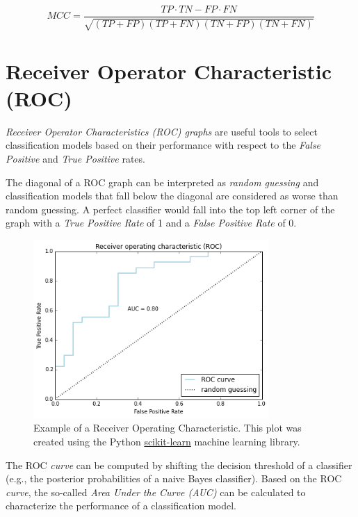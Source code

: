 \documentclass{article}
\begin{document}
\begin{equation} MCC = \frac{ TP \cdot TN - FP \cdot FN } {\sqrt{ (TP + FP) ( TP + FN ) ( TN + FP ) ( TN + FN ) } } \end{equation}



\section{Receiver Operator Characteristic (ROC)}

\emph{Receiver Operator Characteristics (ROC) graphs} are useful tools to select classification models based on their performance with respect to the \emph{False Positive} and \emph{True Positive} rates. 


The diagonal of a ROC graph can be interpreted as \emph{random guessing} and classification models that fall below the diagonal are considered as worse than random guessing. A perfect classifier would fall into the top left corner of the graph with a \emph{True Positive Rate} of 1 and a  \emph{False Positive Rate} of 0.

\begin{figure}[h!]
    \centering
    \includegraphics[width=0.8\textwidth]{./plot/roc.png}
    \caption{Example of a Receiver Operating Characteristic. This plot was created using the Python \href{http://scikit-learn.org/stable/auto_examples/plot_roc.html}{scikit-learn} machine learning library.}

\end{figure}


\noindent The ROC \emph{curve} can be computed by shifting the decision threshold of a classifier (e.g., the posterior probabilities of a naive Bayes classifier). Based on the  ROC \emph{curve}, the so-called \emph{Area Under the Curve (AUC)} can be calculated to characterize the performance of a classification model.


\newpage

{}

\end{document}
